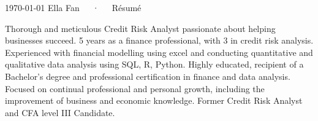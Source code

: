 \documentclass[11pt, a4paper]{awesome-cv}
\begin{document}
\makecvheader[C]

\makecvfooter
  {\today}
  {Ella Fan~~~·~~~Résumé}
  {\thepage}


% 
% 
% 
% 
% 



\begin{cvparagraph}

Thorough and meticulous Credit Risk Analyst passionate about helping businesses succeed.
5 years as a finance professional, with 3 in credit risk analysis.
Experienced with financial modelling using excel and conducting quantitative and qualitative data analysis using SQL, R, Python.
Highly educated, recipient of a Bachelor's degree and professional certification in finance and data analysis. 
Focused on continual professional and personal growth, including the improvement of business and economic knowledge.
Former Credit Risk Analyst and CFA level III Candidate.
\end{cvparagraph}

\end{document}
